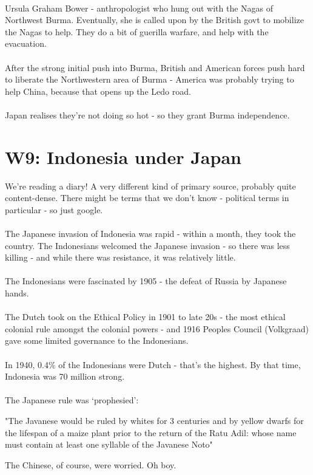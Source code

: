 \documentclass[a4paper]{article}
\begin{document}
\\
Ursula Graham Bower - anthropologist who hung out with the Nagas of Northwest Burma. Eventually, she is called upon by the British govt to mobilize the Nagas to help. They do a bit of guerilla warfare, and help with the evacuation.\\
\\
After the strong initial push into Burma, British and American forces push hard to liberate the Northwestern area of Burma - America was probably trying to help China, because that opens up the Ledo road.\\
\\
Japan realises they're not doing so hot - so they grant Burma independence.
\section{W9: Indonesia under Japan}
We're reading a diary! A very different kind of primary source, probably quite content-dense. There might be terms that we don't know - political terms in particular - so just google.\\
\\
The Japanese invasion of Indonesia was rapid - within a month, they took the country. The Indonesians welcomed the Japanese invasion - so there was less killing - and while there was resistance, it was relatively little.\\
\\
The Indonesians were fascinated by 1905 - the defeat of Russia by Japanese hands.\\
\\
The Dutch took on the Ethical Policy in 1901 to late 20s - the most ethical colonial rule amongst the colonial powers - and 1916 Peoples Council (Volkgraad) gave some limited governance to the Indonesians.\\
\\
In 1940, 0.4\% of the Indonesians were Dutch - that's the highest. By that time, Indonesia was 70 million strong.\\
\\
The Japanese rule was `prophesied':
\begin{displayquote}
	"The Javanese would be ruled by whites for 3 centuries and by yellow dwarfs for the lifespan of a maize plant prior to the return of the Ratu Adil: whose name must contain at least one syllable of the Javanese Noto"
\end{displayquote}
The Chinese, of course, were worried. Oh boy.\\
\end{document}
